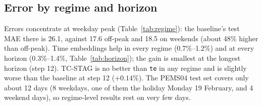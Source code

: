 \documentclass[conference]{IEEEtran}
\begin{document}
\subsection{Error by regime and horizon}\label{sec:regimehorizon}
Errors concentrate at weekday peak (Table~\ref{tab:regime}): the baseline's test MAE there is 26.1, against 17.6 off-peak and 18.5 on weekends (about 48\% higher than off-peak). Time embeddings help in every regime (0.7\%--1.2\%) and at every horizon (0.3\%--1.4\%, Table~\ref{tab:horizon}); the gain is smallest at the longest horizon (step 12). TC-STAG is no better than \texttt{te} in any regime and is slightly worse than the baseline at step 12 ($+0.14\%$). The PEMS04 test set covers only about 12 days (8 weekdays, one of them the holiday Monday 19 February, and 4 weekend days), so regime-level results rest on very few days.
\begin{table}[t]
\centering\caption{Test MAE by regime on PEMS04 (mean of 3 seeds).}\label{tab:regime}
\footnotesize
{}
\end{table}
\begin{table}[t]
\centering\caption{Test MAE by prediction step on PEMS04 (mean of 3 seeds).}\label{tab:horizon}
\footnotesize
{}
\end{table}
\end{document}
